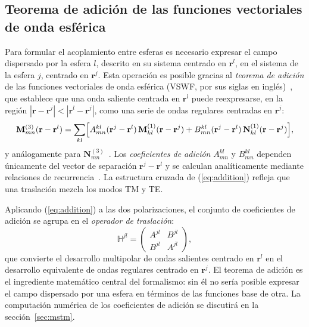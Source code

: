 \subsection{Teorema de adición de las funciones vectoriales de onda esférica}
 
Para formular el acoplamiento entre esferas es necesario expresar el
campo dispersado por la esfera $l$, descrito en su sistema centrado en
$\mathbf{r}^l$, en el sistema de la esfera $j$, centrado en
$\mathbf{r}^j$. Esta operación es posible gracias al \textit{teorema de
adición} de las funciones vectoriales de onda
esférica (VSWF, por sus siglas en inglés)~\cite{Stein1961,Cruzan1962,Mackowski1991,Mishchenko2002}, que
establece que una onda saliente centrada en $\mathbf{r}^l$ puede
reexpresarse, en la región $|\mathbf{r}-\mathbf{r}^j| < |\mathbf{r}^l-\mathbf{r}^j|$, como una serie de ondas
regulares centradas en $\mathbf{r}^j$:
\begin{equation}
\label{eq:addition}
  \mathbf{M}_{mn}^{(3)}(\mathbf{r}-\mathbf{r}^l)
  = \sum_{kl}\Bigl[
       A_{mn}^{kl}(\mathbf{r}^j-\mathbf{r}^l)\,
         \mathbf{M}_{kl}^{(1)}(\mathbf{r}-\mathbf{r}^j)
     + B_{mn}^{kl}(\mathbf{r}^j-\mathbf{r}^l)\,
         \mathbf{N}_{kl}^{(1)}(\mathbf{r}-\mathbf{r}^j)
     \Bigr],
\end{equation}
y análogamente para $\mathbf{N}_{mn}^{(3)}$~\cite[ecs.~9--10]{Mackowski1991}.
Los \textit{coeficientes de adición} $A_{mn}^{kl}$ y $B_{mn}^{kl}$
dependen únicamente del vector de separación
$\mathbf{r}^j-\mathbf{r}^l$ y se calculan analíticamente mediante
relaciones de recurrencia~\cite{Mackowski1996}. La
estructura cruzada de (\ref{eq:addition}) refleja que una traslación
mezcla los modos TM y TE.
 
Aplicando (\ref{eq:addition}) a las dos polarizaciones, el conjunto de
coeficientes de adición se agrupa en el \textit{operador de traslación}:
\begin{equation}
\label{eq:Hjl}
  \mathbb{H}^{jl}
  =
  \begin{pmatrix}
    A^{jl} & B^{jl} \\
    B^{jl} & A^{jl}
  \end{pmatrix},
\end{equation}
que convierte el desarrollo multipolar de ondas salientes centrado en
$\mathbf{r}^l$ en el desarrollo equivalente de ondas regulares centrado en
$\mathbf{r}^j$. El teorema de adición es el ingrediente matemático
central del formalismo: sin él no sería posible expresar el campo
dispersado por una esfera en términos de las funciones base de otra. 
La computación numérica de los coeficientes de adición se discutirá en la
sección~\ref{sec:mstm}.
 
